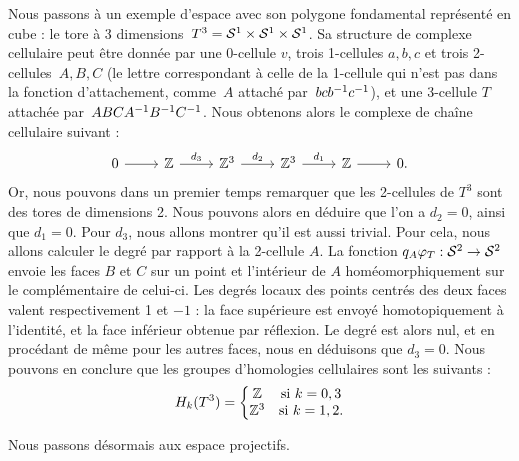 \begin{exemple}
Nous passons à un exemple d'espace avec son polygone fondamental représenté en cube : le tore à 3 dimensions~${T^3=\mathcal{S}^{1}\times\mathcal{S}^{1}\times\mathcal{S}^{1}}$. Sa structure de complexe cellulaire peut être donnée par une 0-cellule $v$, trois 1-cellules $a,b,c$ et trois 2-cellules~$A,B,C$ (le lettre correspondant à celle de la 1-cellule qui n'est pas dans la fonction d'attachement, comme~$A$ attaché par~$bcb^{-1} c^{-1}$), et une 3-cellule $T$ attachée par~${ABCA^{-1} B^{-1} C^{-1}}$. Nous obtenons alors le complexe de chaîne cellulaire suivant : \[\begin{tikzcd}
0\arrow[r]&\bb{Z}\arrow[r,"d_3"]&\bb{Z}^3\arrow[r,"d_2"]&\bb{Z}^3\arrow[r,"d_1"]&\bb{Z}\arrow[r]&0.
\end{tikzcd}\] Or, nous pouvons dans un premier temps remarquer que les 2-cellules de $T^3$ sont des tores de dimensions 2. Nous pouvons alors en déduire que l'on a $d_2=0$, ainsi que $d_1=0$. Pour $d_3$, nous allons montrer qu'il est aussi trivial. Pour cela, nous allons calculer le degré par rapport à la 2-cellule $A$. La fonction $q_A\varphi_T:\mathcal{S}^{2}\to\mathcal{S}^{2}$ envoie les faces $B$ et $C$ sur un point et l'intérieur de $A$ homéomorphiquement sur le complémentaire de celui-ci. Les degrés locaux des points centrés des deux faces valent respectivement 1 et $-1$ : la face supérieure est envoyé homotopiquement à l'identité, et la face inférieur obtenue par réflexion. Le degré est alors nul, et en procédant de même pour les autres faces, nous en déduisons que $d_3=0$. Nous pouvons en conclure que les groupes d'homologies cellulaires sont les suivants : \[H_k(T^3)=\left\{\begin{matrix}
\mathbb{Z}&\text{si }k=0,3\\
\mathbb{Z}^3&\text{si }k=1,2.
\end{matrix}\right.\]
\end{exemple}

Nous passons désormais aux espace projectifs.

